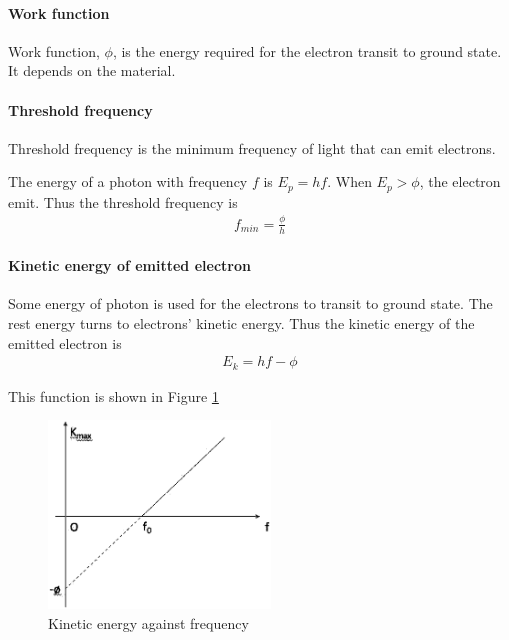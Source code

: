         \paragraph{Work function}
            Work function, $\phi$, is the energy required for the electron transit to ground state. It depends on the material. 

        \paragraph{Threshold frequency}
            Threshold frequency is the minimum frequency of light that can emit electrons.

            The energy of a photon with frequency $f$ is $E_p = hf$. When $E_p > \phi$, the electron emit. Thus the threshold frequency is
            \begin{align}
                f_{min} = \frac{\phi}{h}
            \end{align}

        \paragraph{Kinetic energy of emitted electron}
            Some energy of photon is used for the electrons to transit to ground state. The rest energy turns to electrons' kinetic energy. Thus the kinetic energy of the emitted electron is
            \begin{align}
                E_k = hf - \phi
            \end{align}

            This function is shown in Figure \ref{thres_freq_func}

            \begin{figure}[H]
                \begin{center}
                    \includegraphics[height=5cm]{quantum_charts/thres_freq_func.eps}
                \end{center}
                \caption{Kinetic energy against frequency}
                \label{thres_freq_func}
            \end{figure}

